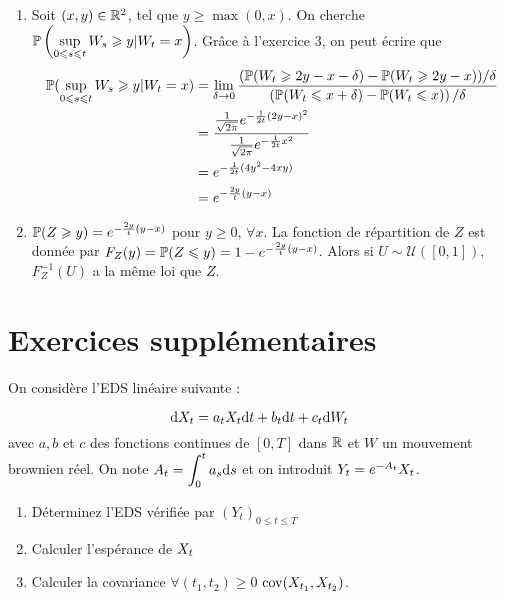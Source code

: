\begin{enumerate}
\item Soit $(x,y) \in \R^2$, tel que $y \geq \max(0,x)$. On cherche $\dps \P\left(\supu \ws \geq y \vert \wt = x\right)$. Grâce à l'exercice 3, on peut écrire que
\begin{equation*}
\begin{split}
  \P(\supu\ws\geq y \vert \wt = x) &= \lim_{\delta \to 0} \frac{(\P(\wt \geq 2y - x - \delta) - \P(\wt \geq 2y -x))/\delta}{\left(\P(\wt \leq x + \delta) - \P(\wt \leq x)\right)/\delta} \\
  &= \frac{ \frac{1}{\sqrt{2\pi}}e^{- \frac{1}{2t}(2y-x)^2}}{ \frac{1}{\sqrt{2\pi}} e^{- \frac{1}{2t} x^2}} \\
  &= e^{- \frac{1}{2t}(4y^2 - 4xy)} \\
  &= e^{- \frac{2y}{t}(y-x)}
\end{split}
\end{equation*}

\item $\P(Z \geq y) = e^{- \frac{2y}{t}(y-x)}$ pour $y \geq 0, \,\forall x$. La fonction de répartition de $Z$ est donnée par $F_Z(y) = \P(Z \leq y ) = 1 - e^{- \frac{2y}{t}(y-x)}$. Alors si $U \sim \mathcal{U}([0,1])$, $F_Z^{-1}(U)$ a la même loi que $Z$.
\end{enumerate}

\section{Exercices supplémentaires}

\begin{exo}
On considère l'EDS linéaire suivante :

  \[ \der \xt = a_t \xt \der t + b_t \der t + c_t \der \wt \]
  avec $a,b$ et $c$ des fonctions continues de $[0,T]$ dans $\R$ et $W$ un mouvement brownien réel. On note $\dps A_t = \int_{0}^{t} a_s \der s$ et on introduit $Y_t = e^{-A_t} \xt$. 
\begin{enumerate}
\item Déterminez l'EDS vérifiée par $(Y_t)_{0 \leq t \leq T}$
  \item Calculer l'espérance de $\xt$
  \item Calculer la covariance $\forall (t_1, t_2) \geq 0$ $\cov(X_{t_1}, X_{t_2})$.
\end{enumerate}
\end{exo}

